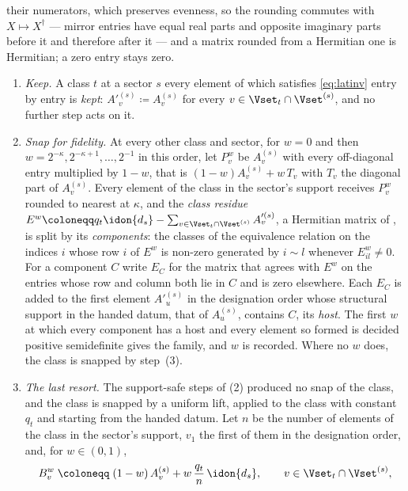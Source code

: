 \begin{definition}
their numerators, which preserves evenness, so the rounding commutes with
$X\mapsto X^{\dagger}$ --- mirror entries have equal real parts and opposite
imaginary parts before it and therefore after it --- and a matrix rounded
from a Hermitian one is Hermitian; a zero entry stays zero.
\begin{enumerate}[label=(\arabic*),leftmargin=2.4em]
\item \emph{Keep.} A class $t$ at a sector $s$ every element of which
  satisfies \eqref{eq:latinv} entry by entry is \emph{kept}:
  $A'^{(s)}_v\coloneqq A^{(s)}_v$ for every $v\in\Vset_t\cap\Vset^{(s)}$, and
  no further step acts on it.
\item \emph{Snap for fidelity.} At every other class and sector, for $w=0$
  and then $w=2^{-\kappa},2^{-\kappa+1},\dots,2^{-1}$ in this order, let
  $P^{w}_v$ be $A^{(s)}_v$ with every off-diagonal entry multiplied by
  $1-w$, that is $(1-w)A^{(s)}_v+w\,T_v$ with $T_v$ the diagonal part of
  $A^{(s)}_v$. Every element of the class in the sector's support receives
  $P^{w}_v$ rounded to nearest at $\kappa$, and the \emph{class residue}
  $E^{w}\coloneqq q_t\idon{d_s}-\sum_{v\in\Vset_t\cap\Vset^{(s)}}A'^{(s)}_v$,
  a Hermitian matrix of , is split by its \emph{components}:
  the classes of the equivalence relation on the indices $i$ whose row $i$ of
  $E^{w}$ is non-zero generated by $i\sim l$ whenever $E^{w}_{il}\ne0$. For a
  component $C$ write $E_C$ for the matrix that agrees with $E^{w}$ on the
  entries whose row and column both lie in $C$ and is zero elsewhere. Each
  $E_C$ is added to the first element $A'^{(s)}_u$ in the designation order
  whose structural support in the handed datum, that of $A^{(s)}_u$,
  contains $C$, its \emph{host}. The first $w$ at which every component has
  a host and every element so formed is decided positive semidefinite gives
  the family, and $w$ is recorded. Where no $w$ does, the class is snapped
  by step~(3).
\item \emph{The last resort.} The support-safe steps of (2) produced no snap
  of the class, and the class is snapped by a uniform lift, applied to the
  class with constant $q_t$ and starting from the handed datum. Let $n$ be
  the number of elements of the class in the sector's support, $v_1$ the
  first of them in the designation order, and, for $w\in(0,1)$,
  \begin{equation}\label{eq:lastresort}
    B^{w}_v\;\coloneqq\;(1-w)\,A^{(s)}_v+w\,\frac{q_t}{n}\,\idon{d_s},
    \qquad v\in\Vset_t\cap\Vset^{(s)},
  \end{equation}

\end{enumerate}
\end{definition}
